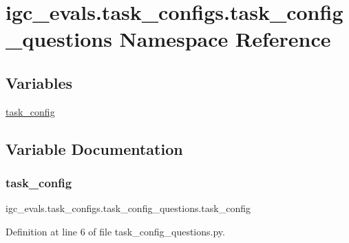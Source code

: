 \hypertarget{namespaceigc__evals_1_1task__configs_1_1task__config__questions}{}\section{igc\+\_\+evals.\+task\+\_\+configs.\+task\+\_\+config\+\_\+questions Namespace Reference}
\label{namespaceigc__evals_1_1task__configs_1_1task__config__questions}
\subsection*{Variables}
\begin{DoxyCompactItemize}
\item 
\hyperlink{namespaceigc__evals_1_1task__configs_1_1task__config__questions_a38150718703071fdb0df9c348899e842}{task\+\_\+config}
\end{DoxyCompactItemize}


\subsection{Variable Documentation}
\mbox{\label{namespaceigc__evals_1_1task__configs_1_1task__config__questions_a38150718703071fdb0df9c348899e842}} 
\subsubsection{\texorpdfstring{task\+\_\+config}{task\_config}}
{\footnotesize\ttfamily igc\+\_\+evals.\+task\+\_\+configs.\+task\+\_\+config\+\_\+questions.\+task\+\_\+config}



Definition at line 6 of file task\+\_\+config\+\_\+questions.\+py.

